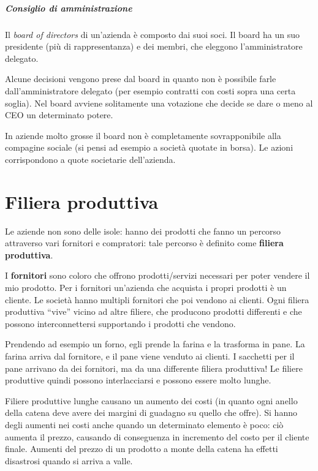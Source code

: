 \paragraph*{Consiglio di amministrazione} Il \textit{board of directors} di
un'azienda è composto dai suoi soci. Il board ha un suo presidente (più di
rappresentanza) e dei membri, che eleggono l'amministratore delegato.

Alcune decisioni vengono prese dal board in quanto non è possibile farle
dall'amministratore delegato (per esempio contratti con costi sopra una certa
soglia). Nel board avviene solitamente una votazione che decide se dare o meno al CEO un determinato potere.

In aziende molto grosse il board non è completamente sovrapponibile alla
compagine sociale (si pensi ad esempio a società quotate in borsa). Le azioni
corrispondono a quote societarie dell'azienda.

\chapter{Filiera produttiva}


Le aziende non sono delle isole: hanno dei prodotti che fanno un percorso 
attraverso vari fornitori e compratori: tale percorso è definito come
\textbf{filiera produttiva}.

I \textbf{fornitori} sono coloro che offrono prodotti/servizi necessari per
poter vendere il mio prodotto. Per i fornitori un'azienda che acquista i propri
prodotti è un cliente. Le società hanno multipli fornitori che poi
vendono ai clienti.
Ogni filiera produttiva ``vive'' vicino ad altre filiere,
che producono prodotti differenti e che possono interconnettersi supportando i
prodotti che vendono.

Prendendo ad esempio un forno, egli prende la farina e la trasforma in pane. La
farina arriva dal fornitore, e il pane viene venduto ai clienti. I sacchetti
per il pane arrivano da dei fornitori, ma da una differente filiera produttiva!
Le filiere produttive quindi possono interlacciarsi e possono essere molto
lunghe.

Filiere produttive lunghe causano un aumento dei costi (in quanto ogni anello
della catena deve avere dei margini di guadagno su quello che offre). Si hanno
degli aumenti nei costi anche quando un determinato elemento è poco: ciò
aumenta il prezzo, causando di conseguenza in incremento del costo per il
cliente finale. Aumenti del prezzo di un prodotto a monte della catena ha
effetti disastrosi quando si arriva a valle.

